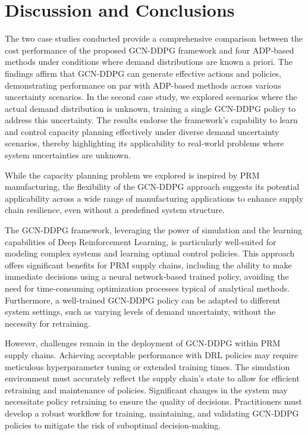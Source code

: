 \documentclass[preprint,review,12pt,nonatbib]{elsarticle}
\begin{document}
\section{Discussion and Conclusions}
\label{sec:conclusion}
The two case studies conducted provide a comprehensive comparison between the cost performance of the proposed GCN-DDPG framework and four ADP-based methods under conditions where demand distributions are known a priori. The findings affirm that GCN-DDPG can generate effective actions and policies, demonstrating performance on par with ADP-based methods across various uncertainty scenarios. In the second case study, we explored scenarios where the actual demand distribution is unknown, training a single GCN-DDPG policy to address this uncertainty. The results endorse the framework's capability to learn and control capacity planning effectively under diverse demand uncertainty scenarios, thereby highlighting its applicability to real-world problems where system uncertainties are unknown.

While the capacity planning problem we explored is inspired by PRM manufacturing, the flexibility of the GCN-DDPG approach suggests its potential applicability across a wide range of manufacturing applications to enhance supply chain resilience, even without a predefined system structure.


The GCN-DDPG framework, leveraging the power of simulation and the learning capabilities of Deep Reinforcement Learning, is particularly well-suited for modeling complex systems and learning optimal control policies. This approach offers significant benefits for PRM supply chains, including the ability to make immediate decisions using a neural network-based trained policy, avoiding the need for time-consuming optimization processes typical of analytical methods. Furthermore, a well-trained GCN-DDPG policy can be adapted to different system settings, such as varying levels of demand uncertainty, without the necessity for retraining.

However, challenges remain in the deployment of GCN-DDPG within PRM supply chains. Achieving acceptable performance with DRL policies may require meticulous hyperparameter tuning or extended training times. The simulation environment must accurately reflect the supply chain's state to allow for efficient retraining and maintenance of policies. Significant changes in the system may necessitate policy retraining to ensure the quality of decisions. Practitioners must develop a robust workflow for training, maintaining, and validating GCN-DDPG policies to mitigate the risk of suboptimal decision-making.
\end{document}
